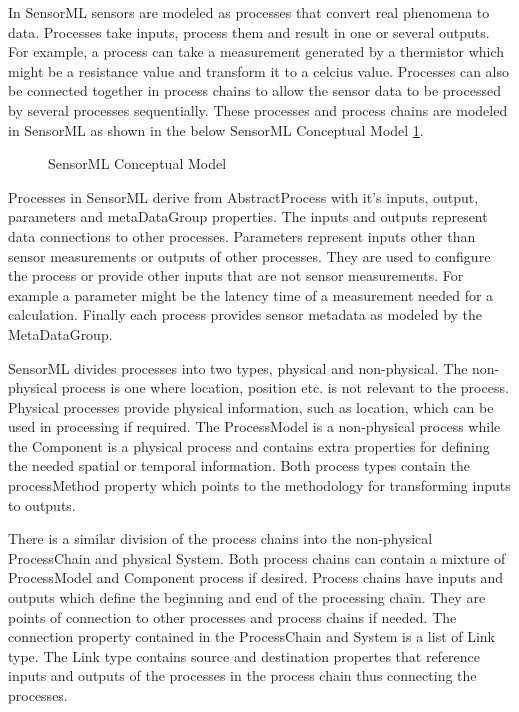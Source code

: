 \documentclass[]{final_report}
\begin{document}
In SensorML sensors are modeled as processes that convert real phenomena to data. Processes take inputs, process them and result in one or several outputs. For example, a process can take a measurement generated by a thermistor which might be a resistance value and transform it to a celcius value. Processes can also be connected together in process chains to allow the sensor data to be processed by several processes sequentially. These processes and process chains are modeled in SensorML as shown in the  below SensorML Conceptual Model \ref{fig:SMLConceptualModel}.

\begin{figure}[h]
\caption{SensorML Conceptual Model}\label{fig:SMLConceptualModel}
\end{figure}

Processes in SensorML derive from AbstractProcess with it's inputs, output, parameters and metaDataGroup properties. The inputs and outputs represent data connections to other processes. Parameters represent inputs other than sensor measurements or outputs of other processes. They are used to configure the process or provide other inputs that are not sensor measurements. For example a parameter might be the latency time of a measurement needed for a calculation. Finally each process provides sensor metadata as modeled by the MetaDataGroup.

SensorML divides processes into two types, physical and non-physical. The non-physical process is one where  location, position etc. is not relevant to the process. Physical processes provide physical information, such as location, which can be used in processing if required. The ProcessModel is a non-physical process while the Component is a physical process and contains extra properties for defining the needed spatial or temporal information. Both process types contain the processMethod property which points to the methodology for transforming inputs to outputs.

There is a similar division of the process chains into the non-physical ProcessChain and physical System. Both process chains can contain a mixture of ProcessModel and Component process if desired. Process chains have inputs and outputs which define the beginning and end of the processing chain. They are points of connection to other processes and process chains if needed. The connection property contained in the ProcessChain and System is a list of Link type. The Link type contains source and destination propertes that reference inputs and outputs of the processes in the process chain thus connecting the processes. 
\end{document}
